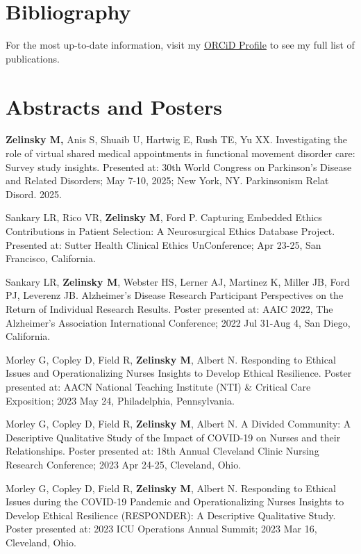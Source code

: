 \documentclass[
  letterpaper,
  DIV=11,
  numbers=noendperiod]{scrartcl}
\begin{document}
\section{Bibliography}\label{bibliography}

For the most up-to-date information, visit my
\href{https://orcid.org/0000-0001-6964-8794}{ORCiD Profile} to see my
full list of publications.

\section{Abstracts and Posters}\label{abstracts-and-posters}

\textbf{Zelinsky M,} Anis S, Shuaib U, Hartwig E, Rush TE, Yu XX.
Investigating the role of virtual shared medical appointments in
functional movement disorder care: Survey study insights. Presented at:
30th World Congress on Parkinson's Disease and Related Disorders; May
7-10, 2025; New York, NY. Parkinsonism Relat Disord. 2025.

Sankary LR, Rico VR, \textbf{Zelinsky M}, Ford P. Capturing Embedded
Ethics Contributions in Patient Selection: A Neurosurgical Ethics
Database Project. Presented at: Sutter Health Clinical Ethics
UnConference; Apr 23-25, San Francisco, California.

Sankary LR, \textbf{Zelinsky M}, Webster HS, Lerner AJ, Martinez K,
Miller JB, Ford PJ, Leverenz JB. Alzheimer's Disease Research
Participant Perspectives on the Return of Individual Research Results.
Poster presented at: AAIC 2022, The Alzheimer's Association
International Conference; 2022 Jul 31-Aug 4, San Diego, California.

Morley G, Copley D, Field R, \textbf{Zelinsky M}, Albert N. Responding
to Ethical Issues and Operationalizing Nurses Insights to Develop
Ethical Resilience. Poster presented at: AACN National Teaching
Institute (NTI) \& Critical Care Exposition; 2023 May 24, Philadelphia,
Pennsylvania.

Morley G, Copley D, Field R, \textbf{Zelinsky M}, Albert N. A Divided
Community: A Descriptive Qualitative Study of the Impact of COVID-19 on
Nurses and their Relationships. Poster presented at: 18th Annual
Cleveland Clinic Nursing Research Conference; 2023 Apr 24-25, Cleveland,
Ohio.

Morley G, Copley D, Field R, \textbf{Zelinsky M}, Albert N. Responding
to Ethical Issues during the COVID-19 Pandemic and Operationalizing
Nurses Insights to Develop Ethical Resilience (RESPONDER): A Descriptive
Qualitative Study. Poster presented at: 2023 ICU Operations Annual
Summit; 2023 Mar 16, Cleveland, Ohio.
\end{document}
